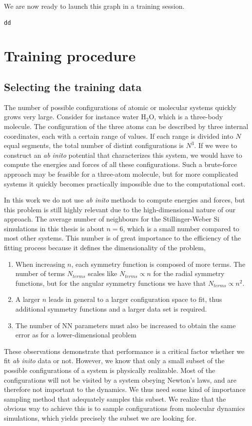 \documentclass[twoside,english]{uiofysmaster}
\begin{document}
We are now ready to launch this graph in a training session. 
\begin{lstlisting}[language=Python]
 dd	
\end{lstlisting}


\chapter{Training procedure}

\section{Selecting the training data}
The number of possible configurations of atomic or molecular systems quickly grows very large. 
Consider for instance water $\textrm{H}_2\textrm{O}$, which is a three-body molecule. The configuration of the
three atoms can be described by three internal coordinates, each with a certain range of values. 
If each range is divided into $N$ equal segments, the total number of distint configurations is $N^3$. 
If we were to construct an \textit{ab inito} potential that characterizes this system, we would have to compute the energies 
and forces of all these configurations. 
Such a brute-force approach may be feasible for a three-atom molecule, but for more complicated systems
it quickly becomes practically impossible due to the computational cost. 

In this work we do not use \textit{ab inito} methods to compute energies and forces, but this problem is still highly relevant
due to the high-dimensional nature of our approach. The average number of neighbours for the Stillinger-Weber Si simulations
in this thesis is about $n=6$, which is a small number compared to most other systems.  
This number is of great importance to the efficiency of the fitting process because it defines the dimensionality 
of the problem,
\begin{enumerate}
 \item When increasing $n$, each symmetry function is composed of 
 more terms. The number of terms $N_{terms}$ scales like $N_{terms} \propto n$ for the radial symmetry functions, 
 but for the angular symmetry functions we have that $N_{terms} \propto n^2$. 
 \item A larger $n$ leads in general to a larger configuration space to fit, thus additional symmetry functions and 
 a larger data set is required. 
 \item The number of NN parameters must also be increased to obtain the same error as for a lower-dimensional problem
\end{enumerate}
These observations demonstrate that performance is a critical factor whether we fit \textit{ab inito} data or 
not. However, we know that only a small subset of the possible configurations of a system is physically realizable. 
Most of the configurations will not be visited by a system obeying Newton's laws, and are therefore not important to
the dynamics. We thus need some kind of importance sampling method that adequately samples this subset. 
We realize that the obvious way to achieve this is to sample configurations from molecular dynamics simulations, which
yields precisely the subset we are looking for. 
\end{document}
